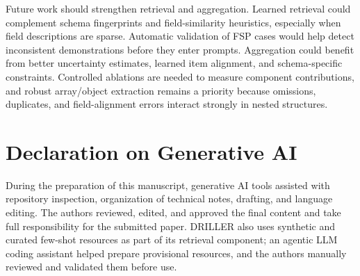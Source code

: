 Future work should strengthen retrieval and aggregation. Learned retrieval could complement schema fingerprints and field-similarity heuristics, especially when field descriptions are sparse. Automatic validation of FSP cases would help detect inconsistent demonstrations before they enter prompts. Aggregation could benefit from better uncertainty estimates, learned item alignment, and schema-specific constraints. Controlled ablations are needed to measure component contributions, and robust array/object extraction remains a priority because omissions, duplicates, and field-alignment errors interact strongly in nested structures.

\section*{Declaration on Generative AI}

During the preparation of this manuscript, generative AI tools assisted with repository inspection, organization of technical notes, drafting, and language editing. The authors reviewed, edited, and approved the final content and take full responsibility for the submitted paper. DRILLER also uses synthetic and curated few-shot resources as part of its retrieval component; an agentic LLM coding assistant helped prepare provisional resources, and the authors manually reviewed and validated them before use.

